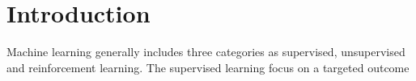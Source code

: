 \section{Introduction}

Machine learning generally includes three categories as supervised, unsupervised and reinforcement learning. The supervised learning focus on a targeted outcome
